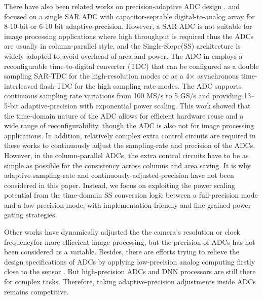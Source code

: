 There have also been related works on precision-adaptive ADC design \cite{zhu_06_2013}\cite{zhu_6--10-bit_2015}\cite{el-halwagy_100-mss5-gss_2018}. \cite{zhu_06_2013} and \cite{zhu_6--10-bit_2015} focused on a single SAR ADC with capacitor-seprable digital-to-analog array for 8-10-bit or 6-10 bit adaptive-precision.
However, a SAR ADC is not suitable for image processing applications where high throughput is required thus the ADCs are usually in column-parallel style, and the Single-Slope(SS)
architecture is widely adopted to avoid overhead of area and power.  
The ADC in \cite{zhu_6--10-bit_2015} employs a reconfigurable time-to-digital converter (TDC) that can be configured as a double sampling SAR-TDC for the high-resolution modes or as a 4× asynchronous time-interleaved flash-TDC for the high sampling rate modes. The ADC supports continuous sampling rate variations from 100 MS/s to 5 GS/s and providing 13–5-bit
adaptive-precision with exponential power scaling. This work showed that the time-domain nature of the ADC allows for efficient hardware reuse and a wide range of reconfigurability, though the ADC is also not for image processing applications. 
In addition, relatively complex extra control circuits are required in these works to continuously adjust the sampling-rate and precision of the ADCs. However, in the column-parallel ADCs, the extra control circuits have to be as simple as possible for the consistency across columns and area saving. It is why adaptive-sampling-rate and continuously-adjusted-precision have not been considered in this paper. Instead, we focus on exploiting the power scaling potential from the time-domain SS conversion logic between a full-precision mode and a low-precision mode, with implementation-friendly and fine-grained power gating strategies.

Other works have dynamically adjusted the the camera’s resolution\cite{lubana_digital_2018} or clock frequency\cite{likamwa_energy_2013}for more efficeient image processing, but the precision of ADCs has not been considered as a variable. Besides, there are efforts trying to relieve the design specifications of ADCs by applying low-precision analog computing firstly close to the sensor \cite{likamwa_redeye_2016}\cite{chen_asp_2016}\cite{liu_ns-cim_2020}. 
But high-precision ADCs and DNN processors are still there for complex tasks. Therefore, taking adaptive-precision adjustments inside ADCs remains competitive.
 
